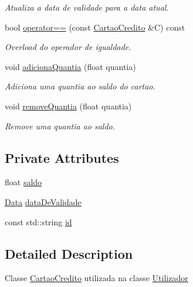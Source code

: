 \begin{DoxyCompactItemize}
\begin{DoxyCompactList}\small\item\em Atualiza a data de validade para a data atual. \end{DoxyCompactList}\item 
bool \mbox{\hyperlink{class_cartao_credito_abf34d4aff89aac4b76d9e15999d85a26}{operator==}} (const \mbox{\hyperlink{class_cartao_credito}{Cartao\+Credito}} \&C) const
\begin{DoxyCompactList}\small\item\em Overload do operador de igualdade. \end{DoxyCompactList}\item 
void \mbox{\hyperlink{class_cartao_credito_a03d4e7d9d645737bc3d162daf3555e25}{adiciona\+Quantia}} (float quantia)
\begin{DoxyCompactList}\small\item\em Adiciona uma quantia ao saldo do cartao. \end{DoxyCompactList}\item 
void \mbox{\hyperlink{class_cartao_credito_a57d3f8baa86eb9a8f348dc7cbc91ea42}{remove\+Quantia}} (float quantia)
\begin{DoxyCompactList}\small\item\em Remove uma quantia ao saldo. \end{DoxyCompactList}\end{DoxyCompactItemize}
\subsection*{Private Attributes}
\begin{DoxyCompactItemize}
\item 
float \mbox{\hyperlink{class_cartao_credito_a2c674ee17ab52017618bf5e3ef9dd3cd}{saldo}}
\item 
\mbox{\hyperlink{class_data}{Data}} \mbox{\hyperlink{class_cartao_credito_ae042cd5a71b48cad207b8975590a774f}{data\+De\+Validade}}
\item 
const std\+::string \mbox{\hyperlink{class_cartao_credito_a4f75c1aed80dc6b2240c7b8e008e5a19}{id}}
\end{DoxyCompactItemize}


\subsection{Detailed Description}
Classe \mbox{\hyperlink{class_cartao_credito}{Cartao\+Credito}} utilizada na classe \mbox{\hyperlink{class_utilizador}{Utilizador}} 

